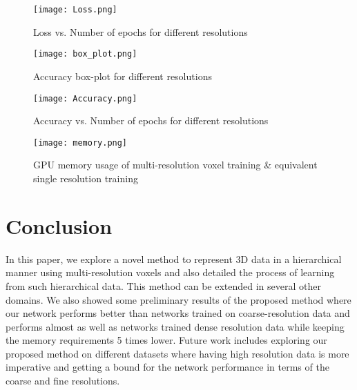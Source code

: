 \documentclass[10pt,letterpaper]{article}
\begin{document}
\begin{figure}[t]
 \centering
 \texttt{[image: Loss.png]}
 \caption{Loss vs. Number of epochs for different resolutions}
 \label{Fig:Loss} 
\end{figure}

\begin{figure}[h]

 \begin{minipage}{0.4\textwidth}
 \centering
 \texttt{[image: box\_plot.png]}
 \caption{Accuracy box-plot for different resolutions}
 \label{Fig:boxplot}
 \end{minipage}
 \hspace{50pt}
  \begin{minipage}{0.4\textwidth}
 \centering
 \texttt{[image: Accuracy.png]}
 \caption{Accuracy vs. Number of epochs for different resolutions}
 \label{Fig:accuracy}
 \end{minipage}
 
\end{figure}

\begin{figure}[h]
 \centering
 \texttt{[image: memory.png]}
 \caption{GPU memory usage of multi-resolution voxel training \& equivalent single resolution training}
 \label{Fig:memory}
\end{figure}


\section{Conclusion}
\label{Sec:Conclusions}

In this paper, we explore a novel method to represent 3D data in a hierarchical manner using multi-resolution voxels and also detailed the process of learning from such hierarchical data. This method can be extended in several other domains. We also showed some preliminary results of the proposed method where our network performs better than networks trained on coarse-resolution data and performs almost as well as networks trained dense resolution data while keeping the memory requirements 5 times lower. Future work includes exploring our proposed method on different datasets where having high resolution data is more imperative and getting a bound for the network performance in terms of the coarse and fine resolutions.





\end{document}
